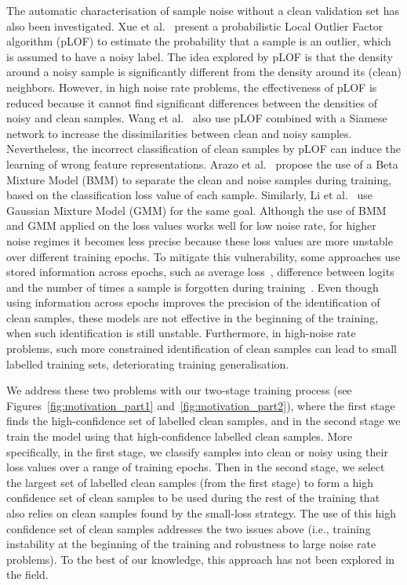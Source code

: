 \documentclass[review]{elsarticle}
\begin{document}
The automatic characterisation of sample noise without a clean validation set has also been investigated.
Xue et al.~\cite{xue2019robust} present a probabilistic Local Outlier Factor algorithm (pLOF) to estimate the probability that a sample is an outlier, which is assumed to have a noisy label. The idea explored by pLOF is that the density around a noisy sample is significantly different from the density around its (clean) neighbors. However, in high noise rate problems, the effectiveness of pLOF is reduced because it cannot find significant differences between the densities of noisy and clean samples. 
Wang et al.~\cite{wang2018iterative} also use pLOF combined with a Siamese network to increase the dissimilarities between clean and noisy samples. Nevertheless, the incorrect classification of clean samples by pLOF can induce the learning of wrong feature representations. Arazo et al.~\cite{arazo2019unsupervised} propose the use of a Beta Mixture Model (BMM) to separate the clean and noise samples during training, based on the classification loss value of each sample. 
Similarly, Li et al.~\cite{li2020dividemix} use Gaussian Mixture Model (GMM) for the same goal.
Although the use of BMM and GMM applied on the loss values works well for low noise rate, for higher noise regimes it becomes less precise because these loss values are more unstable over different training epochs.  
To mitigate this vulnerability, some approaches use stored information across epochs, such as average loss~\cite{relab}, difference between logits~\cite{area_under_margin} and the number of times a sample is forgotten during training~\cite{toneva2018empirical}. 
Even though using information across epochs improves the precision of the identification of clean samples, these models are not effective in the beginning of the training, when such identification is still unstable.
Furthermore, in high-noise rate problems, such more constrained identification of clean samples can lead to small labelled training sets, deteriorating training generalisation.









We  address  these  two  problems  with  our  two-stage  training process 
(see Figures~\ref{fig:motivation_part1} and~\ref{fig:motivation_part2}),
where  the  first  stage  finds  the  
high-confidence 
set  of  labelled clean samples, and in the second stage we train the model using that high-confidence
labelled clean samples. More specifically, in the first stage, we classify samples into clean or noisy using their loss values over a range of training epochs. Then in the second stage, we select the largest set of labelled clean samples (from the first stage) to form a high confidence set of clean samples to be used during the rest of the training that also relies on clean samples found by the small-loss strategy. The use of this high confidence set of clean samples addresses the two issues above (i.e., training instability at the beginning of the training and robustness to large noise rate problems). To the best of our knowledge, this approach has not been explored in the field.
\end{document}
